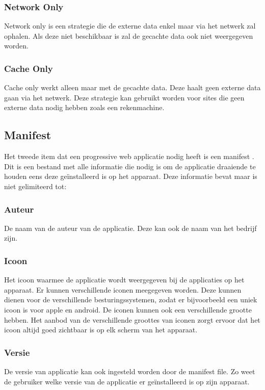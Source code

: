 \subsubsection{Network Only}
Network only is een strategie die de externe data enkel maar via het netwerk zal ophalen. Als deze niet beschikbaar is zal de gecachte data ook niet weergegeven worden.

\subsubsection{Cache Only}
Cache only werkt alleen maar met de gecachte data. Deze haalt geen externe data gaan via het netwerk. Deze strategie kan gebruikt worden voor sites die geen externe data nodig hebben zoals een rekenmachine.

\subsection{Manifest}
Het tweede item dat een progressive web applicatie nodig heeft is een manifest \cite{MANIFEST}. Dit is een bestand met alle informatie die nodig is om de applicatie draaiende te houden eens deze geïnstalleerd is op het apparaat. Deze informatie bevat maar is niet gelimiteerd tot:

\subsubsection{Auteur}
De naam van de auteur van de applicatie. Deze kan ook de naam van het bedrijf zijn.

\subsubsection{Icoon}
Het icoon waarmee de applicatie wordt weergegeven bij de applicaties op het apparaat. Er kunnen verschillende iconen meegegeven worden. Deze kunnen dienen voor de verschillende besturingssystemen, zodat er bijvoorbeeld een uniek icoon is voor apple en android. De iconen kunnen ook een verschillende grootte hebben. Het aanbod van de verschillende groottes van iconen zorgt ervoor dat het icoon altijd goed zichtbaar is op elk scherm van het apparaat.

\subsubsection{Versie}
De versie van applicatie kan ook ingesteld worden door de manifest file. Zo weet de gebruiker welke versie van de applicatie er geïnstalleerd is op zijn apparaat.

